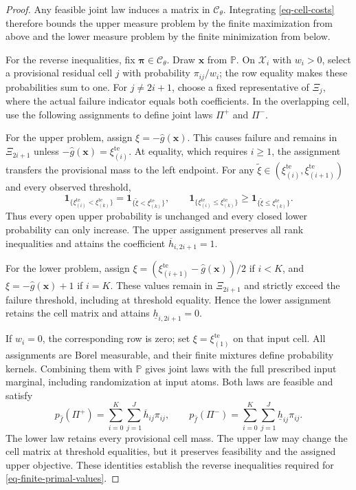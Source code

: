 \begin{proof}
  Any feasible joint law induces a matrix in $\mathcal C_\theta$. Integrating \eqref{eq-cell-costs} therefore bounds the upper measure problem by the finite maximization from above and the lower measure problem by the finite minimization from below.

  For the reverse inequalities, fix $\bm\pi\in\mathcal C_\theta$. Draw $\bm x$ from $\mathbb P$. On $\mathcal X_i$ with $w_i>0$, select a provisional residual cell $j$ with probability $\pi_{ij}/w_i$; the row equality makes these probabilities sum to one. For $j\ne2i+1$, choose a fixed representative of $\Xi_j$, where the actual failure indicator equals both coefficients. In the overlapping cell, use the following assignments to define joint laws $\Pi^+$ and $\Pi^-$.

  For the upper problem, assign $\xi=-\hat g(\bm x)$. This causes failure and remains in $\Xi_{2i+1}$ unless $-\hat g(\bm x)=\xi_{(i)}^{\mathrm{te}}$. At equality, which requires $i\ge1$, the assignment transfers the provisional mass to the left endpoint. For any $\widetilde\xi\in\left(\xi_{(i)}^{\mathrm{te}},\xi_{(i+1)}^{\mathrm{te}}\right)$ and every observed threshold,
  \[
    \mathbf1_{\{\xi_{(i)}^{\mathrm{te}}<\xi_{(k)}^{\mathrm{te}}\}}
      =\mathbf1_{\{\widetilde\xi<\xi_{(k)}^{\mathrm{te}}\}},
    \qquad
    \mathbf1_{\{\xi_{(i)}^{\mathrm{te}}\le\xi_{(k)}^{\mathrm{te}}\}}
      \ge\mathbf1_{\{\widetilde\xi\le\xi_{(k)}^{\mathrm{te}}\}}.
  \]
  Thus every open upper probability is unchanged and every closed lower probability can only increase. The upper assignment preserves all rank inequalities and attains the coefficient $\overline h_{i,2i+1}=1$.

  For the lower problem, assign $\xi=\left(\xi_{(i+1)}^{\mathrm{te}}-\hat g(\bm x)\right)/2$ if $i<K$, and $\xi=-\hat g(\bm x)+1$ if $i=K$. These values remain in $\Xi_{2i+1}$ and strictly exceed the failure threshold, including at threshold equality. Hence the lower assignment retains the cell matrix and attains $\underline h_{i,2i+1}=0$.

  If $w_i=0$, the corresponding row is zero; set $\xi=\xi_{(1)}^{\mathrm{te}}$ on that input cell. All assignments are Borel measurable, and their finite mixtures define probability kernels. Combining them with $\mathbb P$ gives joint laws with the full prescribed input marginal, including randomization at input atoms. Both laws are feasible and satisfy
  \[
    p_{\hat f}(\Pi^+)=\sum_{i=0}^{K}\sum_{j=1}^{J}\overline h_{ij}\pi_{ij},
    \qquad
    p_{\hat f}(\Pi^-)=\sum_{i=0}^{K}\sum_{j=1}^{J}\underline h_{ij}\pi_{ij}.
  \]
  The lower law retains every provisional cell mass. The upper law may change the cell matrix at threshold equalities, but it preserves feasibility and the assigned upper objective. These identities establish the reverse inequalities required for \eqref{eq-finite-primal-values}.


\end{proof}
